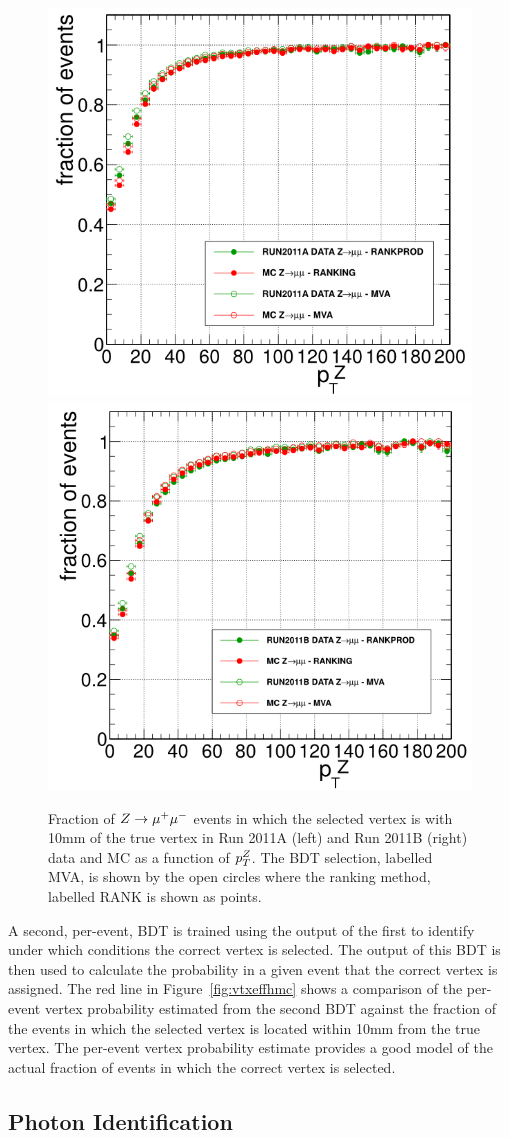 \begin{figure}
\includegraphics[width=.49\textwidth]{hgg7TeV/generalPlots/PT_vtx_z_2011A.png}
\includegraphics[width=.49\textwidth]{hgg7TeV/generalPlots/PT_vtx_z_2011B.png}
\caption{Fraction of $Z\rightarrow \mu^{+}\mu^{-}$ events in which the selected vertex is with 10mm of the 
true vertex in Run 2011A (left) and Run 2011B (right) data and MC as a function of $p_{T}^{Z}$. 
The BDT selection, labelled MVA, is shown by the open circles where the ranking method, labelled RANK 
is shown as points.}
\label{fig:vtxzmumu}
\end{figure} 

A second, per-event, BDT is trained using the output of the first to identify 
under which conditions the correct vertex is selected. The output of this BDT is then used to 
calculate the probability in a given event that the correct vertex is assigned. The red line in Figure~\ref{fig:vtxeffhmc}
shows a comparison of the per-event vertex probability estimated from the second BDT against the 
fraction of the events in which the selected vertex is located within 10mm from the true vertex. The per-event vertex probability 
estimate provides a good model of the actual fraction of events in which the correct vertex is selected.

\subsection{Photon Identification}
\label{sec:photonidentification}

